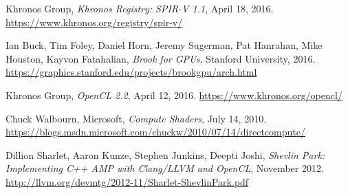 \clearpage{}

\begin{thebibliography}{99}

	Khronos Group,
	\emph{Khronos Registry: SPIR-V 1.1},
	April 18, 2016.
	\url{https://www.khronos.org/registry/spir-v/}

	Ian Buck, Tim Foley, Daniel Horn, Jeremy Sugerman, Pat Hanrahan, Mike Houston, Kayvon Fatahalian,
	\emph{Brook for GPUs},
	Stanford University,
	2016.
	\url{https://graphics.stanford.edu/projects/brookgpu/arch.html}

	Khronos Group,
	\emph{OpenCL 2.2},
	April 12, 2016.
	\url{https://www.khronos.org/opencl/}

	Chuck Walbourn, Microsoft,
	\emph{Compute Shaders},
	July 14, 2010.
	\url{https://blogs.msdn.microsoft.com/chuckw/2010/07/14/directcompute/}

	Dillion Sharlet, Aaron Kunze, Stephen Junkins, Deepti Joshi,
	\emph{Shevlin Park: Implementing C++ AMP with Clang/LLVM and OpenCL},
	November 2012.
	\url{http://llvm.org/devmtg/2012-11/Sharlet-ShevlinPark.pdf}

\end{thebibliography}